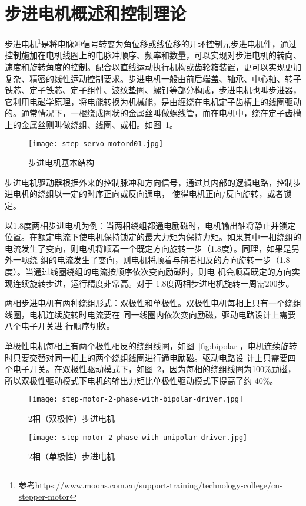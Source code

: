 \section{步进电机概述和控制理论}

步进电机\footnote{参考\url{https://www.moons.com.cn/support-training/technology-college/cn-stepper-motor}}是将电脉冲信号转变为角位移或线位移的开环控制元步进电机件，通过控制施加在电机线圈上的电脉冲顺序、频率和数量，可以实现对步进电机的转向、速度和旋转角度的控制。配合以直线运动执行机构或齿轮箱装置，更可以实现更加复杂、精密的线性运动控制要求。步进电机一般由前后端盖、轴承、中心轴、转子铁芯、定子铁芯、定子组件、波纹垫圈、螺钉等部分构成，步进电机也叫步进器，它利用电磁学原理，将电能转换为机械能，是由缠绕在电机定子齿槽上的线圈驱动的。通常情况下，一根绕成圈状的金属丝叫做螺线管，而在电机中，绕在定子齿槽上的金属丝则叫做绕组、线圈、或相。如图~\ref{fig:Stepper-Motor-Open}。

\begin{figure}[htbp]
    \centering
    \texttt{[image: step-servo-motord01.jpg]}
    \caption{步进电机基本结构}
    \label{fig:Stepper-Motor-Open}
\end{figure}

步进电机驱动器根据外来的控制脉冲和方向信号，通过其内部的逻辑电路，控制步进电机的绕组以一定的时序正向或反向通电， 使得电机正向/反向旋转，或者锁定。

以1.8度两相步进电机为例：当两相绕组都通电励磁时，电机输出轴将静止并锁定位置。在额定电流下使电机保持锁定的最大力矩为保持力矩。如果其中一相绕组的电流发生了变向，则电机将顺着一个既定方向旋转一步（1.8度）。同理，如果是另外一项绕 组的电流发生了变向，则电机将顺着与前者相反的方向旋转一步（1.8度）。当通过线圈绕组的电流按顺序依次变向励磁时，则电 机会顺着既定的方向实现连续旋转步进，运行精度非常高。对于 1.8度两相步进电机旋转一周需200步。

两相步进电机有两种绕组形式：双极性和单极性。双极性电机每相上只有一个绕组线圈，电机连续旋转时电流要在 同一线圈内依次变向励磁，驱动电路设计上需要八个电子开关进 行顺序切换。

单极性电机每相上有两个极性相反的绕组线圈，如图~\ref{fig:bipolar}，电机连续旋转时只要交替对同一相上的两个绕组线圈进行通电励磁。驱动电路设 计上只需要四个电子开关。在双极性驱动模式下，如图~\ref{fig:unipolar}，因为每相的绕组线圈为100\%励磁，所以双极性驱动模式下电机的输出力矩比单极性驱动模式下提高了约 40\%。

\begin{figure}[htbp]
    \begin{minipage}{0.48\textwidth}
      \centering
      \texttt{[image: step-motor-2-phase-with-bipolar-driver.jpg]}
      \caption{2相（双极性）步进电机}
      \label{fig:bipolar}
    \end{minipage}\hfill
    \begin{minipage}{0.48\textwidth}
      \centering
      \texttt{[image: step-motor-2-phase-with-unipolar-driver.jpg]}
      \caption{2相（单极性）步进电机}
      \label{fig:unipolar}
    \end{minipage}
\end{figure}


